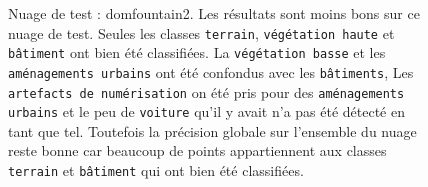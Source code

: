 \documentclass[a4paper, onecolumn, 11pt]{article}
\begin{document}
\begin{figure}[h]
    \qquad
    \caption{Nuage de test : domfountain2. Les résultats sont moins bons sur ce nuage de test. Seules les classes \texttt{terrain}, \texttt{végétation haute} et \texttt{bâtiment} ont bien été classifiées. La \texttt{végétation basse} et les \texttt{aménagements urbains} ont été confondus avec les \texttt{bâtiments}, Les \texttt{artefacts de numérisation} on été pris pour des \texttt{aménagements urbains} et le peu de \texttt{voiture} qu'il y avait n'a pas été détecté en tant que tel. Toutefois la précision globale sur l'ensemble du nuage reste bonne car beaucoup de points appartiennent aux classes \texttt{terrain} et \texttt{bâtiment} qui ont bien été classifiées.}
    \label{fig:domfountain2}
\end{figure}
\end{document}
